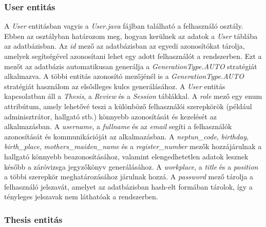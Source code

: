 \subsubsection{User entitás}

A \textit{User} entitásban vagyis a \textit{User.java} fájlban található a felhasználó osztály. Ebben az osztályban határozom meg, hogyan kerülnek az adatok a \textit{User} táblába az adatbázisban. Az \textit{id} mező az adatbázisban az egyedi azonosítókat tárolja, amelyek segítségével azonosítani lehet egy adott felhasználót a rendszerben. Ezt a mezőt az adatbázis automatikusan generálja a \textit{GenerationType.AUTO} stratégiát alkalmazva. A többi entitás azonosító mezőjénél is a \textit{GenerationType.AUTO} stratégiát használom az elsődleges kulcs generálásához. A \textit{User} entitás kapcsolatban áll a \textit{Thesis}, a \textit{Review} és a \textit{Session} táblákkal. A \textit{role} mező egy enum attribútum, amely lehetővé teszi a különböző felhasználói szerepkörök (például adminisztrátor, hallgató stb.) könnyebb azonosítását és kezelését az alkalmazásban. A \textit{username}, a \textit{fullname} és az \textit{email} segíti a felhasználók azonosítását és kommunikációját az alkalmazásban. A \textit{neptun\_code}, \textit{birthday}, \textit{birth\_place}, \textit{mothers\_maiden\_name} és a \textit{register\_number} mezők hozzájárulnak a hallgató könnyebb beazonosításához, valamint elengedhetetlen adatok lesznek később a záróvizsga jegyzőkönyv generálásához. A \textit{workplace}, a \textit{title} és a \textit{position} a többi szerepkör meghatározásához járulnak hozzá. A \textit{password} mező tárolja a felhasználó jelszavát, amelyet az adatbázisban hash-elt formában tárolok, így a tényleges jelszavak nem láthatóak a rendszerben.


\subsubsection{Thesis entitás}


